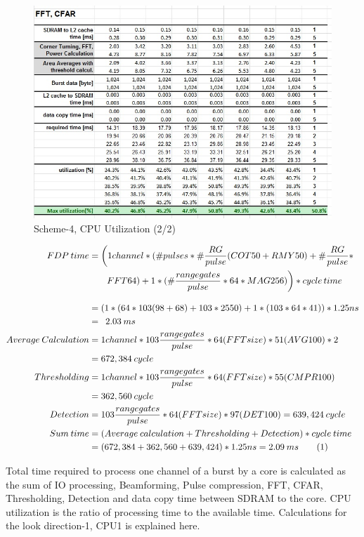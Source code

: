 \begin{figure}[h!]
	\centering
	\includegraphics[width=160mm]{figures/scheme5_cpu_util2}
	\caption{Scheme-4, CPU Utilization (2/2)}
	\label{fig:mm:scheme5_cpu_util2}
\end{figure}

\begin{align*}
	FDP \: time &= \bigg(1channel * (\#pulses * \# \frac{RG}{pulse} (COT50 + RMY50) + \# \frac{RG}{pulse} * \\
		& \qquad FFT64) + 1 * (\# \frac{range gates}{pulse} * 64 * MAG256)\bigg) * cycle \, time \\[0.3cm]
		&= (1 * (64 * 103 (98 + 68) + 103 * 2550) + 1 * (103 * 64 * 41)) * 1.25ns \\
		&= \enspace 2.03 \: ms \\
		Average \: Calculation &= 1channel * 103 \frac{range gates}{pulse} * 64(FFTsize) * 51(AVG100) * 2 \\
		&=  672,384 \: cycle \\
		Thresholding &= 1channel * 103 \frac{range gates}{pulse} * 64(FFTsize) * 55(CMPR100) \\
		&= 362,560 \: cycle \\
		Detection &= 103 \frac{range gates}{pulse} * 64(FFTsize) * 97(DET100) = 639,424 \: cycle \\
		Sum \: time &= (Average \: calculation + Thresholding + Detection) * cycle \: time \\
		&= (672,384 + 362,560 + 639,424) * 1.25ns = 2.09 \: ms	\stepcounter{equation}\tag{\theequation} 
\end{align*}

Total time required to process one channel of a burst by a core is calculated as the sum of IO processing, Beamforming, Pulse compression, FFT, CFAR, Thresholding, Detection and data copy time between SDRAM to the core. CPU utilization is the ratio of processing time to the available time. Calculations for the look direction-1, CPU1 is explained here.

